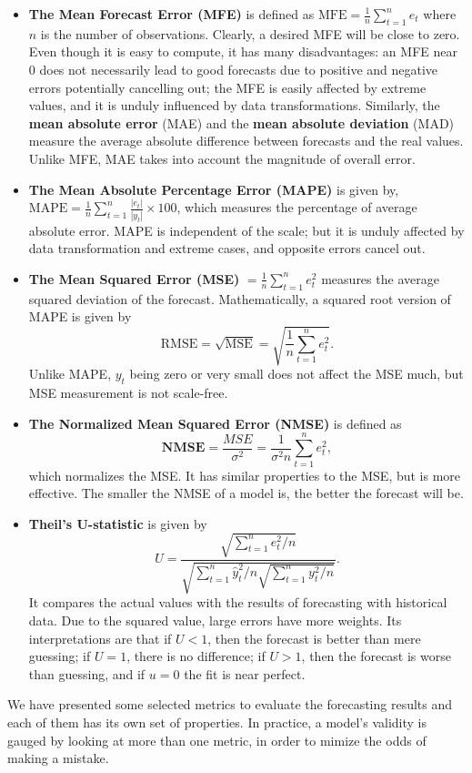  \begin{itemize}[noitemsep]
\item \textbf{The Mean Forecast Error (MFE)} is defined as $\mathrm{MFE}=\frac{1}{n} \sum_{t=1}^{n} e_t $ where $n$ is the number of observations. Clearly, a desired MFE will be close to zero. Even though it is easy to compute, it has many disadvantages: an MFE near 0 does not necessarily lead to good forecasts due to positive and negative errors potentially cancelling out; the MFE is easily affected by extreme values, and it is unduly influenced by data transformations. Similarly, the \textbf{mean absolute error} (MAE) and the \textbf{mean absolute deviation} (MAD) measure the average absolute difference between forecasts and the real values. Unlike MFE, MAE takes into account the magnitude of overall error. 
\item \textbf{The Mean Absolute Percentage Error (MAPE)} is given by, $ \mathrm{MAPE}=\frac{1}{n} \sum_{t=1}^{n} \frac{\left|e_t\right|}{\left|y_t\right|} \times 100 $, which measures the percentage of average absolute error. MAPE is independent of the scale; but it is unduly affected by data transformation and extreme cases, and opposite errors cancel out.
\item \textbf{The Mean Squared Error (MSE)} $= \frac{1}{n} \sum_{t=1}^n {e^2_t}$ measures the average squared deviation of the forecast. Mathematically, a squared root version of MAPE is given by $$\mathrm{RMSE}=\sqrt{\mathrm{MSE}}=\sqrt{\frac{1}{n} \sum_{t=1}^{n} e^2_t}.$$ Unlike MAPE, $y_t$ being zero or very small does not affect the MSE much, but MSE measurement is not scale-free. 
\item \textbf{The Normalized Mean Squared Error (NMSE)} is defined as $$\mathbf{NMSE} =\frac{MSE}{\sigma^2}=\frac{1}{\sigma^2 n} \sum_{t=1}^{n} e^2_t,$$ which normalizes the MSE. It has similar properties to the MSE, but is more effective. The smaller the NMSE of a model is, the better the forecast will be. 
\item \textbf{Theil's U-statistic} is given by $$ U=\frac{\sqrt{\sum_{t=1}^{n} e^2_t /n}}{\sqrt{\sum_{t=1}^{n} \hat{y}^2_t /n \sqrt{\sum_{t=1}^{n} y^2_t /n}}}.$$ It compares the actual values with the results of forecasting with historical data. Due to the squared value, large errors have more weights. Its interpretations are that if $U<1$, then the forecast is better than mere guessing; if $U=1$, there is no difference; if $U>1$, then the forecast is worse than guessing, and if $u=0$ the fit is near perfect. 
\end{itemize}
We have presented some selected metrics to evaluate the forecasting results and each of them has its own set of properties. In practice, a model's validity is gauged by looking at more than one metric, in order to mimize the odds of making a mistake. 
